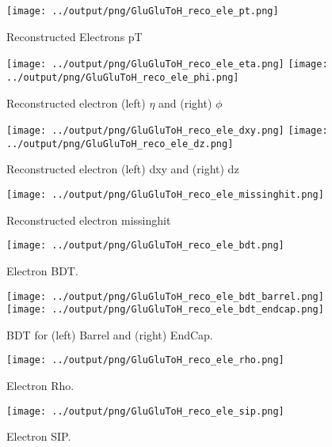 \documentclass[11pt]{book}
\begin{document}
\begin{figure}[ht]
\centering
\texttt{[image: ../output/png/GluGluToH\_reco\_ele\_pt.png]}
\caption{Reconstructed Electrons pT}
\label{fig:gluglu_reco_ele_pt}
\end{figure}

\begin{figure}[ht]
\centering
\texttt{[image: ../output/png/GluGluToH\_reco\_ele\_eta.png]}
\texttt{[image: ../output/png/GluGluToH\_reco\_ele\_phi.png]}
\caption{Reconstructed electron (left) $\eta$ and (right) $\phi$}
\label{fig:gluglu_reco_ele_eta_phi}
\end{figure}

\begin{figure}[ht]
\centering
\texttt{[image: ../output/png/GluGluToH\_reco\_ele\_dxy.png]}
\texttt{[image: ../output/png/GluGluToH\_reco\_ele\_dz.png]}
\caption{Reconstructed electron (left) dxy and (right) dz}
\label{fig:gluglu_reco_ele_dxy_dz}
\end{figure}

\begin{figure}[ht]
\centering
\texttt{[image: ../output/png/GluGluToH\_reco\_ele\_missinghit.png]}
\caption{Reconstructed electron missinghit}
\label{fig:gluglu_reco_ele_missinghit}
\end{figure}

\begin{figure}[ht]
\centering
\texttt{[image: ../output/png/GluGluToH\_reco\_ele\_bdt.png]}
\caption{Electron BDT.}
\label{fig:gluglu_reco_ele_bdt}
\end{figure}

\begin{figure}[ht]
\centering
\texttt{[image: ../output/png/GluGluToH\_reco\_ele\_bdt\_barrel.png]}
\texttt{[image: ../output/png/GluGluToH\_reco\_ele\_bdt\_endcap.png]}
\caption{BDT for (left) Barrel and (right) EndCap.}
\label{fig:gluglu_reco_ele_bdt_regions}
\end{figure}

\begin{figure}[ht]
\centering
\texttt{[image: ../output/png/GluGluToH\_reco\_ele\_rho.png]}
\caption{Electron Rho.}
\label{fig:gluglu_reco_ele_rho}
\end{figure}

\begin{figure}[ht]
\centering
\texttt{[image: ../output/png/GluGluToH\_reco\_ele\_sip.png]}
\caption{Electron SIP.}
\label{fig:gluglu_reco_ele_sip}
\end{figure}
\end{document}
